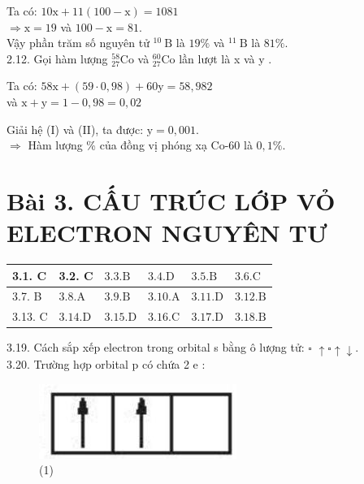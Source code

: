 \documentclass[10pt]{article}
\begin{document}
Ta có: $10 \mathrm{x}+11(100-\mathrm{x})=1081$\\
$\Rightarrow \mathrm{x}=19$ và $100-\mathrm{x}=81$.\\
Vậy phần trăm số nguyên tử ${ }^{10} \mathrm{~B}$ là $19 \%$ và ${ }^{11} \mathrm{~B}$ là $81 \%$.\\
2.12. Gọi hàm lượng ${ }_{27}^{58} \mathrm{Co}$ và ${ }_{27}^{60} \mathrm{Co}$ lần lượt là x và y .

Ta có: $58 \mathrm{x}+(59 \cdot 0,98)+60 \mathrm{y}=58,982$\\
và $\mathrm{x}+\mathrm{y}=1-0,98=0,02$

Giải hệ (I) và (II), ta được: $\mathrm{y}=0,001$.\\
$\Rightarrow$ Hàm lượng \% của đồng vị phóng xạ Co-60 là $0,1 \%$.

\section*{Bài 3. CẤU TRÚC LỚP VỎ ELECTRON NGUYÊN TƯ}
\begin{center}
\begin{tabular}{|l|l|l|l|l|l|}
\hline
3.1. C & 3.2. C & $3.3 . \mathrm{B}$ & $3.4 . \mathrm{D}$ & $3.5 . \mathrm{B}$ & $3.6 . \mathrm{C}$ \\
\hline
3.7. B & $3.8 . \mathrm{A}$ & $3.9 . \mathrm{B}$ & $3.10 . \mathrm{A}$ & $3.11 . \mathrm{D}$ & $3.12 . \mathrm{B}$ \\
\hline
3.13. C & $3.14 . \mathrm{D}$ & $3.15 . \mathrm{D}$ & $3.16 . \mathrm{C}$ & $3.17 . \mathrm{D}$ & $3.18 . \mathrm{B}$ \\
\hline
\end{tabular}
\end{center}

3.19. Cách sắp xếp electron trong orbital s bằng ô lượng tử: $\square$ $\uparrow \square \uparrow \downarrow$.\\
3.20. Trường hợp orbital p có chứa 2 e :

\begin{figure}[h]
\begin{center}
  \includegraphics[width=\textwidth]{2025_10_23_ee735750217b2aca435cg-03(1)}
\captionsetup{labelformat=empty}
\caption{(1)}
\end{center}
\end{figure}
\end{document}
